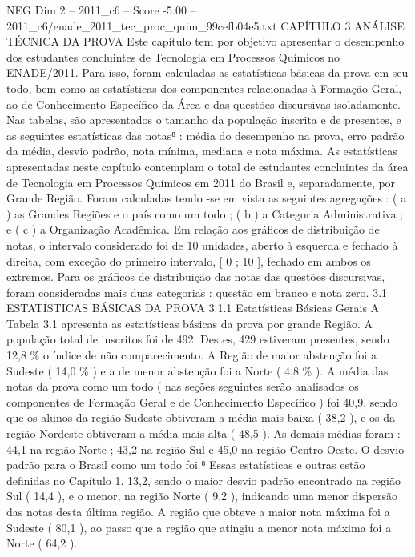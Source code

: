 \begin{textsample}{NEG Dim 2 – 2011\_c6 – Score -5.00 – 2011\_c6/enade\_2011\_tec\_proc\_quim\_99cefb04e5.txt}  \label{ex:f2_neg_027}
CAPÍTULO 3 ANÁLISE TÉCNICA DA PROVA Este capítulo tem por objetivo apresentar o desempenho dos estudantes concluintes de Tecnologia em Processos Químicos no ENADE/2011.
Para isso, foram calculadas as estatísticas básicas da prova em seu todo, bem como as estatísticas dos componentes relacionadas à Formação Geral, ao de Conhecimento Específico da Área e das questões discursivas isoladamente.
Nas tabelas, são apresentados o tamanho da população inscrita e de presentes, e as seguintes estatísticas das notas⁸ : média do desempenho na prova, erro padrão da média, desvio padrão, nota mínima, mediana e nota máxima.
As estatísticas apresentadas neste capítulo contemplam o total de estudantes concluintes da área de Tecnologia em Processos Químicos em 2011 do Brasil e, separadamente, por Grande Região.
Foram calculadas tendo -se em vista as seguintes agregações : ( a ) as Grandes Regiões e o país como um todo ; ( b ) a Categoria Administrativa ; e ( c ) a Organização Acadêmica.
Em relação aos gráficos de distribuição de notas, o intervalo considerado foi de 10 unidades, aberto à esquerda e fechado à direita, com exceção do primeiro intervalo, [ 0 ; 10 ], fechado em ambos os extremos.
Para os gráficos de distribuição das notas das questões discursivas, foram consideradas mais duas categorias : questão em branco e nota zero. 3.1 ESTATÍSTICAS BÁSICAS DA PROVA 3.1.1 Estatísticas Básicas Gerais A Tabela 3.1 apresenta as estatísticas básicas da prova por grande Região.
A população total de inscritos foi de 492.
Destes, 429 estiveram presentes, sendo 12,8 \% o índice de não comparecimento.
A Região de maior abstenção foi a Sudeste ( 14,0 \% ) e a de menor abstenção foi a Norte ( 4,8 \% ).
A média das notas da prova como um todo ( nas seções seguintes serão analisados os componentes de Formação Geral e de Conhecimento Específico ) foi 40,9, sendo que os alunos da região Sudeste obtiveram a média mais baixa ( 38,2 ), e os da região Nordeste obtiveram a média mais alta ( 48,5 ).
As demais médias foram : 44,1 na região Norte ; 43,2 na região Sul e 45,0 na região Centro-Oeste.
O desvio padrão para o Brasil como um todo foi ⁸ Essas estatísticas e outras estão definidas no Capítulo 1. 13,2, sendo o maior desvio padrão encontrado na região Sul ( 14,4 ), e o menor, na região Norte ( 9,2 ), indicando uma menor dispersão das notas desta última região.
A região que obteve a maior nota máxima foi a Sudeste ( 80,1 ), ao passo que a região que atingiu a menor nota máxima foi a Norte ( 64,2 ).

\end{textsample}
